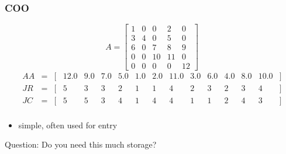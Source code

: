 \documentclass[10pt]{beamer}
\begin{document}
\begin{frame}
\frametitle{COO}
\begin{equation*}
A=
\begin{bmatrix}
1 & 0 & 0 & 2 & 0\\
3 & 4 & 0 & 5 & 0\\
6 & 0 & 7 & 8 & 9\\
0 & 0 & 10 & 11 & 0\\
0 & 0 & 0 & 0 & 12
\end{bmatrix}
\end{equation*}
\begin{equation*}
\begin{array}{llllllllllllllll}
  AA &= & [ & 12.0 & 9.0 & 7.0 & 5.0 & 1.0 & 2.0 & 11.0 & 3.0 & 6.0 & 4.0 & 8.0 & 10.0 & ]\\
  JR &= & [ & 5    & 3   & 3   & 2   & 1   & 1   & 4    & 2   & 3   & 2   & 3   & 4    & ]\\
  JC &= & [ & 5    & 5   & 3   & 4   & 1   & 4   & 4    & 1   & 1   & 2   & 4   & 3    & ]\\
\end{array}
\end{equation*}
\begin{itemize}
  \item simple, often used for entry
\end{itemize}
\begin{alertblock}{}
Question: Do you need this much storage?
\end{alertblock}
\end{frame}
\end{document}
